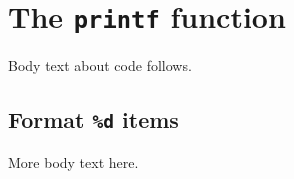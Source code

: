 \documentclass{article}
\begin{document}
\tableofcontents
\cprotect\section{The \verb|printf| function}
Body text about code follows.
\cprotect\subsection{Format \verb|%d| items}
More body text here.
\end{document}
